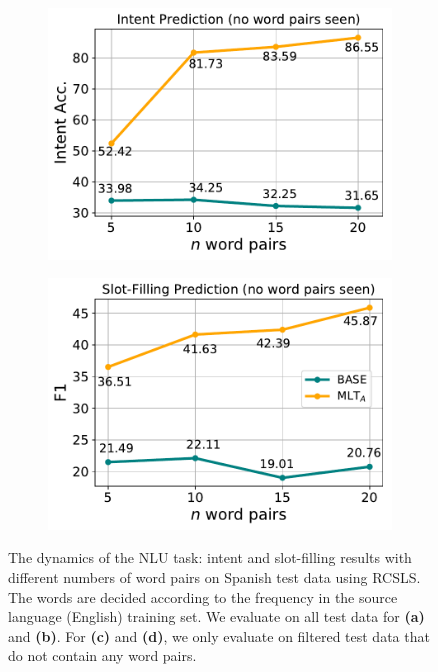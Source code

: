\documentclass[letterpaper]{article}
\begin{document}
\begin{figure}[!ht]
\begin{subfigure}{.24\textwidth}
    \includegraphics[scale=0.32]{es_intent2.pdf}
    \caption{}
    \label{fig:intent-es-unseen}
\end{subfigure}
\begin{subfigure}{.24\textwidth}
    \centering
    \includegraphics[scale=0.32]{es_slot2.pdf}
    \caption{}
    \label{fig:slot-es-unseen}
\end{subfigure}
\caption{The dynamics of the NLU task: intent and slot-filling results with different numbers of word pairs on Spanish test data using RCSLS. The words are decided according to the frequency in the source language (English) training set. We evaluate on all test data for \textbf{(a)} and \textbf{(b)}. For \textbf{(c)} and \textbf{(d)}, we only evaluate on filtered test data that do not contain any word pairs.}
\label{fig:dynamics}
\end{figure}
\end{document}
